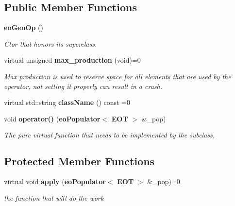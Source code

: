 \subsection*{Public Member Functions}
\begin{CompactItemize}
\item 
{\bf eo\-Gen\-Op} ()\label{classeo_gen_op_a0}

\begin{CompactList}\small\item\em Ctor that honors its superclass. \item\end{CompactList}\item 
virtual unsigned {\bf max\_\-production} (void)=0\label{classeo_gen_op_a1}

\begin{CompactList}\small\item\em Max production is used to reserve space for all elements that are used by the operator, not setting it properly can result in a crash. \item\end{CompactList}\item 
virtual std::string {\bf class\-Name} () const =0\label{classeo_gen_op_a2}

\item 
void {\bf operator()} ({\bf eo\-Populator}$<$ {\bf EOT} $>$ \&\_\-pop)\label{classeo_gen_op_a3}

\begin{CompactList}\small\item\em The pure virtual function that needs to be implemented by the subclass. \item\end{CompactList}\end{CompactItemize}
\subsection*{Protected Member Functions}
\begin{CompactItemize}
\item 
virtual void {\bf apply} ({\bf eo\-Populator}$<$ {\bf EOT} $>$ \&\_\-pop)=0\label{classeo_gen_op_b0}

\begin{CompactList}\small\item\em the function that will do the work \item\end{CompactList}\end{CompactItemize}


